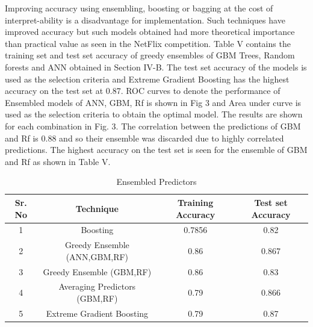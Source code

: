 Improving accuracy using ensembling, boosting or bagging at the cost of interpret-ability is a disadvantage for implementation. Such techniques have improved accuracy but such models obtained had more theoretical importance than practical value as seen in the NetFlix competition. Table V contains the training set and test set accuracy of greedy ensembles of GBM Trees, Random forests and ANN obtained in Section IV-B. The test set accuracy of the models is used as the selection criteria and Extreme Gradient Boosting has the highest accuracy on the test set at 0.87. ROC curves to denote the performance of Ensembled models of ANN, GBM, Rf is shown in Fig 3 and Area under curve is used as the selection criteria to obtain the optimal model. The results are shown for each combination in Fig. 3. The correlation between the predictions of GBM and Rf is 0.88 and so their ensemble was discarded due to highly correlated predictions. The highest accuracy on the test set is seen for the ensemble of GBM and Rf as shown in Table V.  \\

\begin{table}[!h]
\renewcommand{\arraystretch}{2.5}
\caption{Ensembled Predictors}
\label{table}
\centering
\begin{tabular}{|c|c|c|c|}
  \hline
\multicolumn{1}{|c|}{\textbf{Sr. No}} & \multicolumn{1}{c|}{\textbf{Technique}} & \multicolumn{1}{c|}{\textbf{Training Accuracy}} & \multicolumn{1}{c|}{\textbf{Test set Accuracy}}\\
  \hline
  1 & Boosting &  0.7856 & 0.82 \\
  \hline
  2 & Greedy Ensemble (ANN,GBM,RF) &  0.86 & 0.867 \\
  \hline
  3 & Greedy Ensemble (GBM,RF) &  0.86 & 0.83 \\
    \hline
  4 & Averaging Predictors (GBM,RF) &  0.79 & 0.866 \\
    \hline
  5 & Extreme Gradient Boosting &  0.79 & 0.87 \\
  \hline
\end{tabular}
\end{table}






